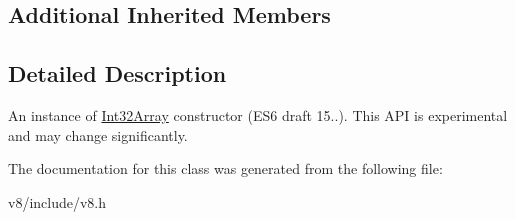 \subsection*{Additional Inherited Members}


\subsection{Detailed Description}
An instance of \hyperlink{classv8_1_1Int32Array}{Int32\+Array} constructor (E\+S6 draft 15..). This A\+PI is experimental and may change significantly. 

The documentation for this class was generated from the following file\+:\begin{DoxyCompactItemize}
\item 
v8/include/v8.\+h\end{DoxyCompactItemize}
